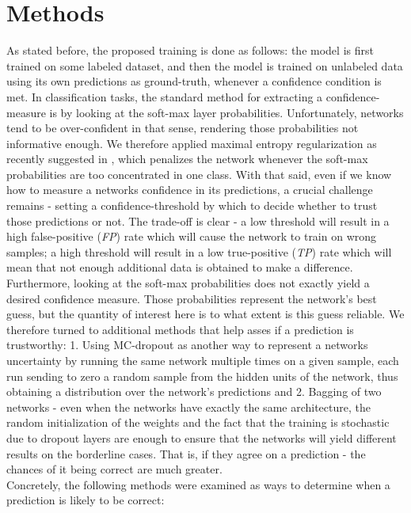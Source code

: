\documentclass[conference, letterpaper]{IEEEtran}
\begin{document}
\section{Methods}
As stated before, the proposed training is done as follows: the model is first trained on some labeled dataset, and then the model is trained on unlabeled data using its own predictions as ground-truth, whenever a confidence condition is met. In classification tasks, the standard method for extracting a confidence-measure is by looking at the soft-max layer probabilities. Unfortunately, networks tend to be over-confident in that sense, rendering those probabilities not informative enough. We therefore applied maximal entropy regularization as recently suggested in \cite{pereyra2017regularizing}, which penalizes the network whenever the soft-max probabilities are too concentrated in one class.
With that said, even if we know how to measure a networks confidence in its predictions, a crucial challenge remains - setting a confidence-threshold by which to decide whether to trust those predictions or not. The trade-off is clear - a low threshold will result in a high false-positive (\textit{FP}) rate which will cause the network to train on wrong samples; a high threshold will result in a low true-positive (\textit{TP}) rate which will mean that not enough additional data is obtained to make a difference. Furthermore, looking at the soft-max probabilities does not exactly yield a desired confidence measure. Those probabilities represent the network's best guess, but the quantity of interest here is to what extent is this guess reliable. We therefore turned to additional methods that help asses if a prediction is trustworthy: 1. Using MC-dropout as another way to represent a networks uncertainty \cite{gal2015dropout} by running the same network multiple times on a given sample, each run sending to zero a random sample from the hidden units of the network, thus obtaining a distribution over the network's predictions  and 2. Bagging of two networks - even when the networks have exactly the same architecture, the random initialization of the weights and the fact that the training is stochastic due to dropout layers are enough to ensure that the networks will yield different results on the borderline cases. That is, if they agree on a prediction - the chances of it being correct are much greater. \\
Concretely, the following methods were examined as ways to determine when a prediction is likely to be correct:
\end{document}

